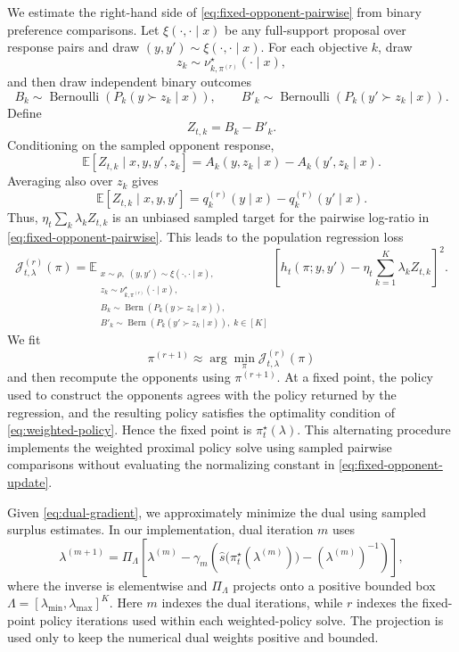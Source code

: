 \documentclass{article}
\theoremstyle{remark}
\theoremstyle{plain}
\newcommand{\E}{\mathbb{E}}
\begin{document}
We estimate the right-hand side of \eqref{eq:fixed-opponent-pairwise} from binary
preference comparisons. Let $\xi(\cdot,\cdot\mid x)$ be any full-support
proposal over response pairs and draw
$(y,y')\sim\xi(\cdot,\cdot\mid x)$. For each objective $k$, draw
\[
z_k\sim\nu^\star_{k,\pi^{(r)}}(\cdot\mid x),
\]
and then draw independent binary outcomes
\[
B_k\sim\operatorname{Bernoulli}\!\left(P_k(y\succ z_k\mid x)\right),
\qquad
B'_k\sim\operatorname{Bernoulli}\!\left(P_k(y'\succ z_k\mid x)\right).
\]
Define
\begin{equation}
Z_{t,k}=B_k-B'_k.
\label{eq:binary-target}
\end{equation}
Conditioning on the sampled opponent response,
\[
\E[Z_{t,k}\mid x,y,y',z_k]
=
A_k(y,z_k\mid x)-A_k(y',z_k\mid x).
\]
Averaging also over $z_k$ gives
\begin{equation}
\E[Z_{t,k}\mid x,y,y']
=
q_k^{(r)}(y\mid x)-q_k^{(r)}(y'\mid x).
\label{eq:binary-target-mean}
\end{equation}
Thus, $\eta_t\sum_k\lambda_k Z_{t,k}$ is an unbiased sampled target for the
pairwise log-ratio in \eqref{eq:fixed-opponent-pairwise}. This leads to the
population regression loss
\begin{equation}
\mathcal J^{(r)}_{t,\lambda}(\pi)
=
\E_{\substack{
x\sim\rho,\;(y,y')\sim\xi(\cdot,\cdot\mid x),\\
z_k\sim\nu^\star_{k,\pi^{(r)}}(\cdot\mid x),\\
B_k\sim\operatorname{Bern}(P_k(y\succ z_k\mid x)),\\
B'_k\sim\operatorname{Bern}(P_k(y'\succ z_k\mid x)),\;k\in[K]
}}
\left[
h_t(\pi;y,y')
-
\eta_t\sum_{k=1}^K\lambda_k Z_{t,k}
\right]^2.
\label{eq:regression-loss}
\end{equation}
We fit
\[
\pi^{(r+1)}
\approx
\arg\min_{\pi}\mathcal J^{(r)}_{t,\lambda}(\pi)
\]
and then recompute the opponents using $\pi^{(r+1)}$. At a fixed point, the
policy used to construct the opponents agrees with the policy returned by the
regression, and the resulting policy satisfies the optimality condition of
\eqref{eq:weighted-policy}. Hence the fixed point is
$\pi_t^\star(\lambda)$. This alternating procedure implements the weighted
proximal policy solve using sampled pairwise comparisons without evaluating the
normalizing constant in \eqref{eq:fixed-opponent-update}.

Given \eqref{eq:dual-gradient}, we approximately minimize the dual using sampled
surplus estimates. In our implementation, dual iteration $m$ uses
\begin{equation}
\lambda^{(m+1)}
=
\Pi_{\Lambda}\!\left[
\lambda^{(m)}
-
\gamma_m\left(
\widehat s\bigl(\pi_t^\star(\lambda^{(m)})\bigr)
-
(\lambda^{(m)})^{-1}
\right)
\right],
\label{eq:dual-update}
\end{equation}
where the inverse is elementwise and $\Pi_\Lambda$ projects onto a positive
bounded box $\Lambda=[\lambda_{\min},\lambda_{\max}]^K$. Here $m$ indexes the
dual iterations, while $r$ indexes the fixed-point policy iterations used within
each weighted-policy solve. The projection is used only to keep the numerical
dual weights positive and bounded.
\end{document}
